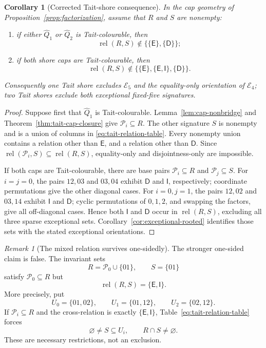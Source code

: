 \documentclass[11pt]{article}
\newtheorem{corollary}[theorem]{Corollary}
\theoremstyle{definition}
\theoremstyle{remark}
\newtheorem{remark}[theorem]{Remark}
\begin{document}
\begin{corollary}[Corrected Tait-shore consequence]
\label{cor:tait-shore}
In the cap geometry of Proposition~\ref{prop:factorization}, assume
that \(R\) and \(S\) are nonempty:
\begin{enumerate}[label=(\roman*),leftmargin=2.4em]
\item if either \(\widehat Q_1\) or \(\widehat Q_2\) is
  Tait-colourable, then
  \[
  \operatorname{rel}(R,S)\notin
                \bigl\{\{\mathsf E\},\{\mathsf D\}\bigr\};
  \]
\item if both shore caps are Tait-colourable, then
  \[
  \operatorname{rel}(R,S)\notin
  \bigl\{\{\mathsf E\},\{\mathsf E,\mathsf I\},
                         \{\mathsf D\}\bigr\}.
  \]
\end{enumerate}
Consequently one Tait shore excludes \(\mathcal E_5\) and the
equality-only orientation of \(\mathcal E_4\); two Tait shores exclude
both exceptional fixed-five signatures.
\end{corollary}

\begin{proof}
Suppose first that \(\widehat Q_1\) is Tait-colourable.
Lemma~\ref{lem:cap-nonbridge} and
Theorem~\ref{thm:tait-cap-closure} give
\(\mathcal P_i\subseteq R\).  The other signature \(S\) is nonempty and
is a union of columns in \eqref{eq:tait-relation-table}.  Every nonempty union contains a
relation other than \(\mathsf E\), and a relation other than
\(\mathsf D\).  Since
\(\operatorname{rel}(\mathcal P_i,S)\subseteq
\operatorname{rel}(R,S)\), equality-only and disjointness-only are
impossible.

If both caps are Tait-colourable, there are base pairs
\(\mathcal P_i\subseteq R\) and \(\mathcal P_j\subseteq S\).
For \(i=j=0\), the pairs \(12,03\) and \(03,04\) exhibit
\(\mathsf D\) and \(\mathsf I\), respectively; coordinate permutations
give the other diagonal cases.  For \(i=0,j=1\), the pairs \(12,02\)
and \(03,14\) exhibit \(\mathsf I\) and \(\mathsf D\); cyclic
permutations of \(0,1,2\), and swapping the factors, give all
off-diagonal cases.  Hence both \(\mathsf I\) and \(\mathsf D\) occur
in \(\operatorname{rel}(R,S)\), excluding all three sparse exceptional
sets.  Corollary~\ref{cor:exceptional-rooted} identifies those sets
with the stated exceptional orientations.
\end{proof}

\begin{remark}[The mixed relation survives one-sidedly]
The stronger one-sided claim is false.  The invariant sets
\[
 R=\mathcal P_0\cup\{01\},\qquad S=\{01\}
\]
satisfy \(\mathcal P_0\subseteq R\) but
\[
                    \operatorname{rel}(R,S)
                    =\{\mathsf E,\mathsf I\}.            \tag{6.14}
\]
More precisely, put
\[
 U_0=\{01,02\},\qquad U_1=\{01,12\},\qquad
 U_2=\{02,12\}.
\]
If \(\mathcal P_i\subseteq R\) and the cross-relation is exactly
\(\{\mathsf E,\mathsf I\}\), Table~\eqref{eq:tait-relation-table} forces
\[
                      \varnothing\ne S\subseteq U_i,
 \qquad R\cap S\ne\varnothing.                         \tag{6.15}
\label{eq:tait-mixed-constraint}
\]
These are necessary restrictions, not an exclusion.
\end{remark}
\end{document}
